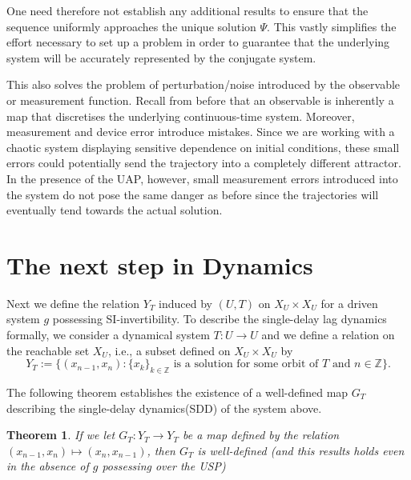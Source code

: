 \documentclass[a4paper,12pt,twoside]{report}
\newtheorem{Theorem}{Theorem}[]
\begin{document}
One need therefore not establish any additional results to ensure that the sequence uniformly approaches the unique solution $\Psi$. This vastly simplifies the effort necessary to set up a problem in order to guarantee that the underlying system will be accurately represented by the conjugate system.

This also solves the problem of perturbation/noise introduced by the observable or measurement function. Recall from before that an observable is inherently a map that discretises the underlying continuous-time system. Moreover, measurement and device error introduce mistakes. Since we are working with a chaotic system displaying sensitive dependence on initial conditions, these small errors could potentially send the trajectory into a completely different attractor. 
In the presence of the UAP, however, small measurement errors introduced into the system do not pose the same danger as before since the trajectories will eventually tend towards the actual solution.

\section{The next step in Dynamics}

Next we define the relation $Y_T$ induced by $(U,T)$ on $X_U\times{X_U}$ for a driven system $g$ possessing SI-invertibility.  To describe the  single-delay lag dynamics formally, we consider a dynamical system $T: U \to U$ and we define a relation on the reachable set $X_U$, i.e., a subset defined on $X_U \times X_U$ by 
$$Y_T:=\{(x_{n-1},x_n): \{x_k\}_{k\in \mathbb{Z}} \mbox{ is a solution for some orbit of } T \mbox{ and } n \in \mathbb{Z}\}.$$ 

The following theorem establishes the existence of a well-defined map $G_T$ describing the single-delay dynamics(SDD) of the system above. 

\begin{Theorem}
If we let $G_T:Y_T\to{Y_T}$ be a map defined by the relation $(x_{n-1},x_n)\mapsto(x_n,x_{n-1})$, then $G_T$ is well-defined (and this results holds even in the absence of $g$ possessing over the USP)  
\end{Theorem}
\end{document}
